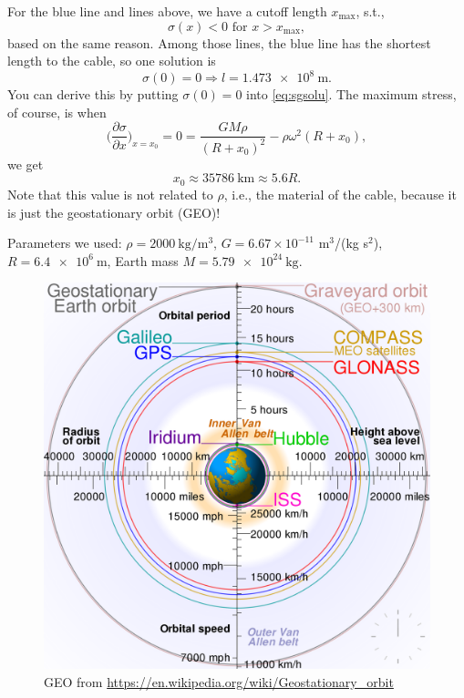 \documentclass[12pt]{article}
\begin{document}
For the blue line and lines above, we have a cutoff length $x_\text{max}$, s.t.,
\begin{equation}
	\sigma(x) < 0 \text{ for } x > x_\text{max},
\end{equation}
based on the same reason.
Among those lines, the blue line has the shortest length to the cable, so one solution is
\begin{equation}
	\sigma(0) = 0 \Rightarrow l = \SI{1.473e8}{\meter}.
\end{equation}
You can derive this by putting $\sigma(0) = 0$ into \eqref{eq:sgsolu}.
The maximum stress, of course, is when
\begin{equation}
	\bigg( \frac{ \partial \sigma }{ \partial x } \bigg)_{x=x_0} = 0 = \frac{G M \rho}{(R + x_0)^2} - \rho \omega^2 (R + x_0),
\end{equation}
we get
\begin{equation}
	x_0 \approx \SI{35786}{\kilo\meter} \approx 5.6 R.
\end{equation}
Note that this value is not related to $\rho$, i.e., the material of the cable, because it is just the geostationary orbit (GEO)!

Parameters we used:
$\rho = \SI{2000}{\kilogram\per\cubic\meter}$,
$G = 6.67 \times 10^{-11}$ m$^3$/(kg s${^2}$), $R = \SI{6.4e6}{\meter}$,
Earth mass $M = \SI{5.79e24}{\kilogram}$.

\begin{figure}[h]
	\centering
	\includegraphics[width=0.7\linewidth]{images/GEO}
	\caption{GEO from \url{https://en.wikipedia.org/wiki/Geostationary_orbit}}
	\label{fig:geo}
\end{figure}
\end{document}
